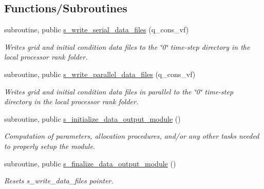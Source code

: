 \subsection*{Functions/\+Subroutines}
\begin{DoxyCompactItemize}
\item 
subroutine, public \hyperlink{namespacem__data__output_abaf86e34cd05a2227a23bcef0671a391}{s\+\_\+write\+\_\+serial\+\_\+data\+\_\+files} (q\+\_\+cons\+\_\+vf)
\begin{DoxyCompactList}\small\item\em Writes grid and initial condition data files to the \char`\"{}0\char`\"{} time-\/step directory in the local processor rank folder. \end{DoxyCompactList}\item 
subroutine, public \hyperlink{namespacem__data__output_a12a171700eb3f8a63d17c01a0033cf39}{s\+\_\+write\+\_\+parallel\+\_\+data\+\_\+files} (q\+\_\+cons\+\_\+vf)
\begin{DoxyCompactList}\small\item\em Writes grid and initial condition data files in parallel to the \char`\"{}0\char`\"{} time-\/step directory in the local processor rank folder. \end{DoxyCompactList}\item 
subroutine, public \hyperlink{namespacem__data__output_ab65b312ef83adb104cafafada9c998b6}{s\+\_\+initialize\+\_\+data\+\_\+output\+\_\+module} ()
\begin{DoxyCompactList}\small\item\em Computation of parameters, allocation procedures, and/or any other tasks needed to properly setup the module. \end{DoxyCompactList}\item 
subroutine, public \hyperlink{namespacem__data__output_a02f2b04a434c1f0ebf9156147d0f976e}{s\+\_\+finalize\+\_\+data\+\_\+output\+\_\+module} ()
\begin{DoxyCompactList}\small\item\em Resets s\+\_\+write\+\_\+data\+\_\+files pointer. \end{DoxyCompactList}\end{DoxyCompactItemize}
